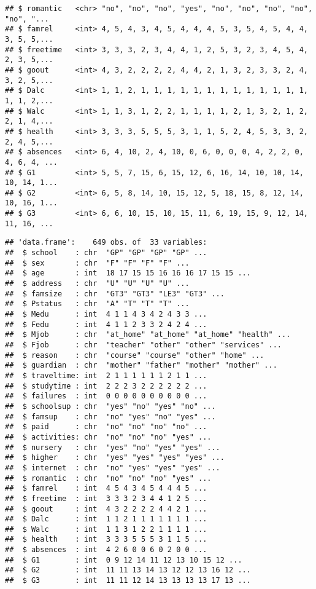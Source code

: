 \documentclass[
]{article}
\begin{document}
\begin{verbatim}
## $ romantic   <chr> "no", "no", "no", "yes", "no", "no", "no", "no", "no", "...
## $ famrel     <int> 4, 5, 4, 3, 4, 5, 4, 4, 4, 5, 3, 5, 4, 5, 4, 4, 3, 5, 5,...
## $ freetime   <int> 3, 3, 3, 2, 3, 4, 4, 1, 2, 5, 3, 2, 3, 4, 5, 4, 2, 3, 5,...
## $ goout      <int> 4, 3, 2, 2, 2, 2, 4, 4, 2, 1, 3, 2, 3, 3, 2, 4, 3, 2, 5,...
## $ Dalc       <int> 1, 1, 2, 1, 1, 1, 1, 1, 1, 1, 1, 1, 1, 1, 1, 1, 1, 1, 2,...
## $ Walc       <int> 1, 1, 3, 1, 2, 2, 1, 1, 1, 1, 2, 1, 3, 2, 1, 2, 2, 1, 4,...
## $ health     <int> 3, 3, 3, 5, 5, 5, 3, 1, 1, 5, 2, 4, 5, 3, 3, 2, 2, 4, 5,...
## $ absences   <int> 6, 4, 10, 2, 4, 10, 0, 6, 0, 0, 0, 4, 2, 2, 0, 4, 6, 4, ...
## $ G1         <int> 5, 5, 7, 15, 6, 15, 12, 6, 16, 14, 10, 10, 14, 10, 14, 1...
## $ G2         <int> 6, 5, 8, 14, 10, 15, 12, 5, 18, 15, 8, 12, 14, 10, 16, 1...
## $ G3         <int> 6, 6, 10, 15, 10, 15, 11, 6, 19, 15, 9, 12, 14, 11, 16, ...
\end{verbatim}

\begin{verbatim}
## 'data.frame':    649 obs. of  33 variables:
##  $ school    : chr  "GP" "GP" "GP" "GP" ...
##  $ sex       : chr  "F" "F" "F" "F" ...
##  $ age       : int  18 17 15 15 16 16 16 17 15 15 ...
##  $ address   : chr  "U" "U" "U" "U" ...
##  $ famsize   : chr  "GT3" "GT3" "LE3" "GT3" ...
##  $ Pstatus   : chr  "A" "T" "T" "T" ...
##  $ Medu      : int  4 1 1 4 3 4 2 4 3 3 ...
##  $ Fedu      : int  4 1 1 2 3 3 2 4 2 4 ...
##  $ Mjob      : chr  "at_home" "at_home" "at_home" "health" ...
##  $ Fjob      : chr  "teacher" "other" "other" "services" ...
##  $ reason    : chr  "course" "course" "other" "home" ...
##  $ guardian  : chr  "mother" "father" "mother" "mother" ...
##  $ traveltime: int  2 1 1 1 1 1 1 2 1 1 ...
##  $ studytime : int  2 2 2 3 2 2 2 2 2 2 ...
##  $ failures  : int  0 0 0 0 0 0 0 0 0 0 ...
##  $ schoolsup : chr  "yes" "no" "yes" "no" ...
##  $ famsup    : chr  "no" "yes" "no" "yes" ...
##  $ paid      : chr  "no" "no" "no" "no" ...
##  $ activities: chr  "no" "no" "no" "yes" ...
##  $ nursery   : chr  "yes" "no" "yes" "yes" ...
##  $ higher    : chr  "yes" "yes" "yes" "yes" ...
##  $ internet  : chr  "no" "yes" "yes" "yes" ...
##  $ romantic  : chr  "no" "no" "no" "yes" ...
##  $ famrel    : int  4 5 4 3 4 5 4 4 4 5 ...
##  $ freetime  : int  3 3 3 2 3 4 4 1 2 5 ...
##  $ goout     : int  4 3 2 2 2 2 4 4 2 1 ...
##  $ Dalc      : int  1 1 2 1 1 1 1 1 1 1 ...
##  $ Walc      : int  1 1 3 1 2 2 1 1 1 1 ...
##  $ health    : int  3 3 3 5 5 5 3 1 1 5 ...
##  $ absences  : int  4 2 6 0 0 6 0 2 0 0 ...
##  $ G1        : int  0 9 12 14 11 12 13 10 15 12 ...
##  $ G2        : int  11 11 13 14 13 12 12 13 16 12 ...
##  $ G3        : int  11 11 12 14 13 13 13 13 17 13 ...
\end{verbatim}
\end{document}
